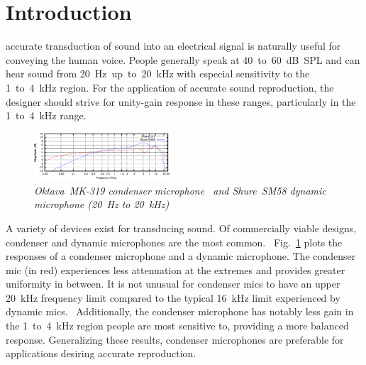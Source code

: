 \documentclass[journal]{IEEEtran}
\begin{document}
\section{Introduction}

 accurate transduction of sound into an electrical signal is naturally useful for conveying the human voice. People generally speak at 40~to~60~dB~SPL and can hear sound from 20~Hz~up~to~20~kHz with especial sensitivity to the 1~to~4~kHz region.\supercite{smith} For the application of accurate sound reproduction, the designer should strive for unity-gain response in these ranges, particularly in the 1~to~4~kHz range.

\begin{figure}[ht]
  \centering
	\includegraphics[width=0.45\textwidth]{OktavaMK319vsShureSM58.png}
  \caption{\em Oktava~MK-319 condenser microphone~\supercite{oktava} and Shure~SM58 dynamic microphone\supercite{shure} (20~Hz to 20~kHz)}
	\label{fig:OktavaMK319vsShureSM58}
\end{figure}

A variety of devices exist for transducing sound. Of commercially viable designs, condenser and dynamic microphones are the most common.~\supercite{shambro} Fig.~\ref{fig:OktavaMK319vsShureSM58} plots the responses of a condenser microphone and a dynamic microphone. The condenser mic (in red) experiences less attenuation at the extremes and provides greater uniformity in between. It is not unusual for condenser mics to have an upper 20~kHz frequency limit compared to the typical 16~kHz limit experienced by dynamic mics.~\supercite{white} Additionally, the condenser microphone has notably less gain in the 1~to~4~kHz region people are most sensitive to, providing a more balanced response. Generalizing these results, condenser microphones are preferable for applications desiring accurate reproduction.

\end{document}
